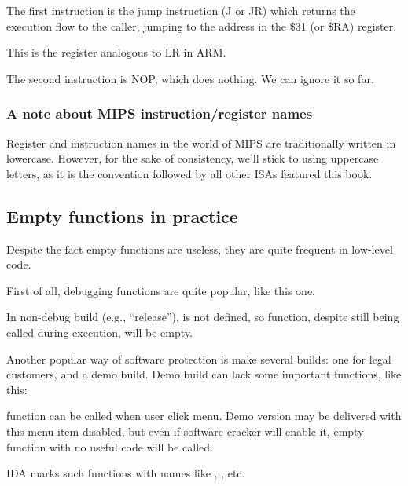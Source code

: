 The first instruction is the jump instruction (J or JR) which returns the execution flow to the \gls{caller},
jumping to the address in the \$31 (or \$RA) register.

This is the register analogous to \ac{LR} in ARM.

The second instruction is \ac{NOP}, which does nothing.
We can ignore it so far.

\subsubsection{A note about MIPS instruction/register names}

Register and instruction names in the world of MIPS are traditionally written in lowercase.
However, for the sake of consistency, we'll stick to using uppercase letters,
as it is the convention followed by all other \ac{ISA}s featured this book.

\subsection{Empty functions in practice}

Despite the fact empty functions are useless, they are quite frequent in low-level code.

First of all, debugging functions are quite popular, like this one:



In non-debug build (e.g., ``release''),  is not defined,
so  function, despite still being called during execution,
will be empty.

Another popular way of software protection is make several builds: one for legal customers, and a demo build.
Demo build can lack some important functions, like this:



 function can be called when user click  menu.
Demo version may be delivered with this menu item disabled, but even if software cracker will enable it,
empty function with no useful code will be called.

IDA marks such functions with names like , , etc.

